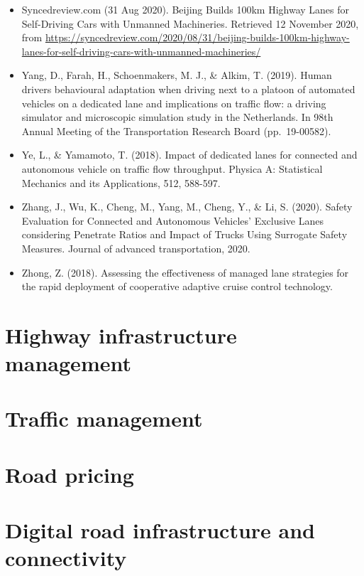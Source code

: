 \documentclass[
]{book}
\begin{document}
\begin{itemize}
\item
  Syncedreview.com (31 Aug 2020). Beijing Builds 100km Highway Lanes for Self-Driving Cars with Unmanned Machineries. Retrieved 12 November 2020, from \url{https://syncedreview.com/2020/08/31/beijing-builds-100km-highway-lanes-for-self-driving-cars-with-unmanned-machineries/}
\item
  Yang, D., Farah, H., Schoenmakers, M. J., \& Alkim, T. (2019). Human drivers behavioural adaptation when driving next to a platoon of automated vehicles on a dedicated lane and implications on traffic flow: a driving simulator and microscopic simulation study in the Netherlands. In 98th Annual Meeting of the Transportation Research Board (pp.~19-00582).
\item
  Ye, L., \& Yamamoto, T. (2018). Impact of dedicated lanes for connected and autonomous vehicle on traffic flow throughput. Physica A: Statistical Mechanics and its Applications, 512, 588-597.
\item
  Zhang, J., Wu, K., Cheng, M., Yang, M., Cheng, Y., \& Li, S. (2020). Safety Evaluation for Connected and Autonomous Vehicles' Exclusive Lanes considering Penetrate Ratios and Impact of Trucks Using Surrogate Safety Measures. Journal of advanced transportation, 2020.
\item
  Zhong, Z. (2018). Assessing the effectiveness of managed lane strategies for the rapid deployment of cooperative adaptive cruise control technology.
\end{itemize}

\hypertarget{highway}{%
\chapter{Highway infrastructure management}\label{highway}}

\hypertarget{traffic}{%
\chapter{Traffic management}\label{traffic}}

\hypertarget{pricing}{%
\chapter{Road pricing}\label{pricing}}

\hypertarget{digital}{%
\chapter{Digital road infrastructure and connectivity}\label{digital}}
\end{document}
